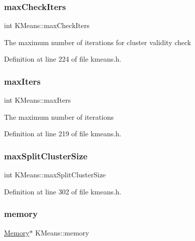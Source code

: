 \subsubsection{\texorpdfstring{max\+Check\+Iters}{maxCheckIters}}
{\footnotesize\ttfamily int K\+Means\+::max\+Check\+Iters\hspace{0.3cm}{\ttfamily [protected]}}

The maximum number of iterations for cluster validity check 

Definition at line 224 of file kmeans.\+h.

\mbox{\label{class_k_means_a605becae019372330541541fec4ecfe5}} 
\subsubsection{\texorpdfstring{max\+Iters}{maxIters}}
{\footnotesize\ttfamily int K\+Means\+::max\+Iters\hspace{0.3cm}{\ttfamily [protected]}}

The maximum number of iterations 

Definition at line 219 of file kmeans.\+h.

\mbox{\label{class_k_means_a99dbe7fd9c440484f54d2f0c2e7bc181}} 
\subsubsection{\texorpdfstring{max\+Split\+Cluster\+Size}{maxSplitClusterSize}}
{\footnotesize\ttfamily int K\+Means\+::max\+Split\+Cluster\+Size\hspace{0.3cm}{\ttfamily [protected]}}



Definition at line 302 of file kmeans.\+h.

\mbox{\label{class_k_means_af11af5cfa79ac50307a580839d36deef}} 
\subsubsection{\texorpdfstring{memory}{memory}}
{\footnotesize\ttfamily \hyperlink{class_memory}{Memory}$\ast$ K\+Means\+::memory\hspace{0.3cm}{\ttfamily [protected]}}

